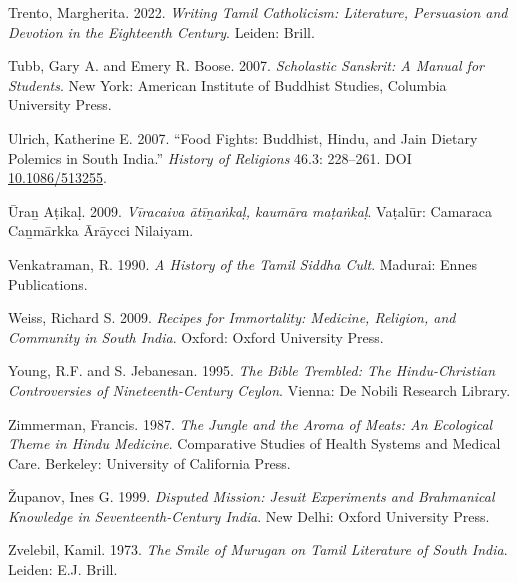 \begin{hangparas}{0.125in}{1}
	\label{Trento2022}Trento, Margherita. 2022. \emph{Writing Tamil Catholicism: Literature, Persuasion and Devotion in the Eighteenth Century}. Leiden: Brill.\medskip


	\label{Tubb2007}Tubb, Gary A. and Emery R. Boose. 2007. \emph{Scholastic Sanskrit: A Manual for Students}. New York: American Institute of Buddhist Studies, Columbia University Press.\medskip


	\label{Ulrich2007}Ulrich, Katherine E. 2007. “Food Fights: Buddhist, Hindu, and Jain Dietary Polemics in South India.” \emph{History of Religions} 46.3: 228–261. DOI \href{https://doi.org/10.1086/513255}{10.1086/513255}.\medskip


	\label{UtanAtikal2009}Ūraṉ Aṭikaḷ. 2009. \emph{{Vīracaiva ātīṉaṅkaḷ, kaumāra maṭaṅkaḷ}}. Vaṭalūr: Camaraca Caṉmārkka Ārāycci Nilaiyam.\medskip


	\label{Venkatraman1990}Venkatraman, R. 1990. \emph{A History of the Tamil Siddha Cult}. Madurai: Ennes Publications.\medskip


	\label{Weiss2009}Weiss, Richard S. 2009. \emph{Recipes for Immortality: Medicine, Religion, and Community in South India}. Oxford: Oxford University Press.\medskip


	\label{Young1995}Young, R.F. and S. Jebanesan. 1995. \emph{The Bible Trembled: The Hindu-Christian Controversies of Nineteenth-Century Ceylon}. Vienna: De Nobili Research Library.\medskip


	\label{Zimmerman1987}Zimmerman, Francis. 1987. \emph{The Jungle and the Aroma of Meats: An Ecological Theme in Hindu Medicine}. Comparative Studies of Health Systems and Medical Care. Berkeley: University of California Press.\medskip


	\label{Zupanov1999}Županov, Ines G. 1999. \emph{Disputed Mission: Jesuit Experiments and Brahmanical Knowledge in Seventeenth-Century India}. New Delhi: Oxford University Press.\medskip


	\label{Zvelebil1973}Zvelebil, Kamil. 1973. \emph{The Smile of Murugan on Tamil Literature of South India}. Leiden: E.\thinskip{}J. Brill. \medskip


      
\end{hangparas}

    
